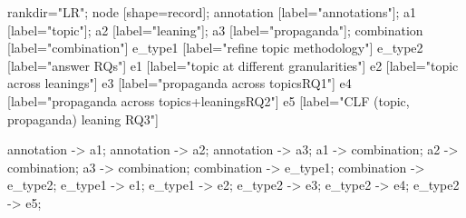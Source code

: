 


 {
    rankdir="LR";
    node [shape=record];
    annotation [label="annotations"];
    a1 [label="topic"];
    a2 [label="leaning"];
    a3 [label="propaganda"];
    combination [label="combination"]
    e_type1 [label="refine topic methodology"]
    e_type2 [label="answer RQs"]
    e1 [label="topic at different granularities"]
    e2 [label="topic across leanings"]
    e3 [label="propaganda across topics\gvnewline RQ1"]
    e4 [label="propaganda across topics+leanings\gvnewline RQ2"]
    e5 [label="CLF (topic, propaganda)  leaning \gvnewline RQ3"]
    
    annotation -> a1;
    annotation -> a2;
    annotation -> a3;
    a1 -> combination;
    a2 -> combination;
    a3 -> combination;
    combination -> e_type1;
    combination -> e_type2;
    e_type1 -> e1;
    e_type1 -> e2;
    e_type2 -> e3;
    e_type2 -> e4;
    e_type2 -> e5;
}
